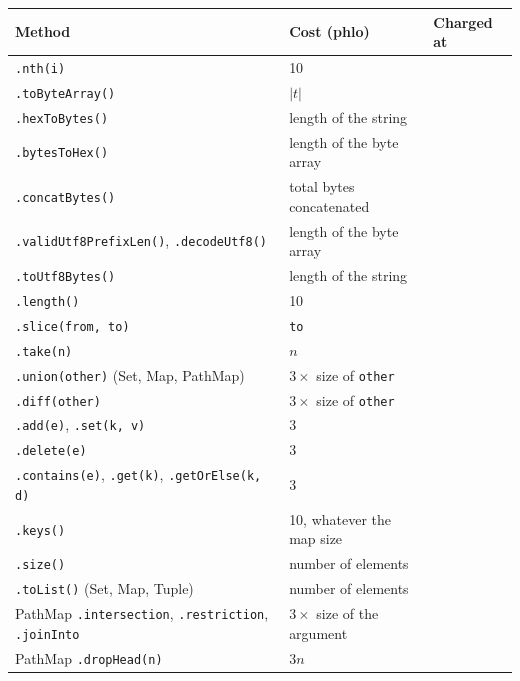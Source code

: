 \begin{longtable}{@{}P{5.4cm}P{5.6cm}P{3.6cm}@{}}
\toprule
\textbf{Method} & \textbf{Cost (phlo)} & \textbf{Charged at} \\
\midrule
\endhead
\texttt{.nth(i)} & 10 &  \\
\texttt{.toByteArray()} & $|t|$ &  \\
\texttt{.hexToBytes()} & length of the string &  \\
\texttt{.bytesToHex()} & length of the byte array &  \\
\texttt{.concatBytes()} & total bytes concatenated &  \\
\texttt{.validUtf8PrefixLen()}, \texttt{.decodeUtf8()} & length of the byte array &  \\
\texttt{.toUtf8Bytes()} & length of the string &  \\
\texttt{.length()} & 10 &  \\
\texttt{.slice(from, to)} & \texttt{to} &  \\
\texttt{.take(n)} & $n$ &  \\
\midrule
\texttt{.union(other)} (Set, Map, PathMap) & $3 \times$ size of \texttt{other} &  \\
\texttt{.diff(other)} & $3 \times$ size of \texttt{other} &  \\
\texttt{.add(e)}, \texttt{.set(k, v)} & 3 &  \\
\texttt{.delete(e)} & 3 &  \\
\texttt{.contains(e)}, \texttt{.get(k)}, \texttt{.getOrElse(k, d)} & 3 &  \\
\texttt{.keys()} & 10, whatever the map size &  \\
\texttt{.size()} & number of elements &  \\
\texttt{.toList()} (Set, Map, Tuple) & number of elements &  \\
\midrule
PathMap \texttt{.intersection}, \texttt{.restriction}, \texttt{.joinInto} & $3 \times$ size of the argument &  \\
PathMap \texttt{.dropHead(n)} & $3n$ &  \\

\end{longtable}
